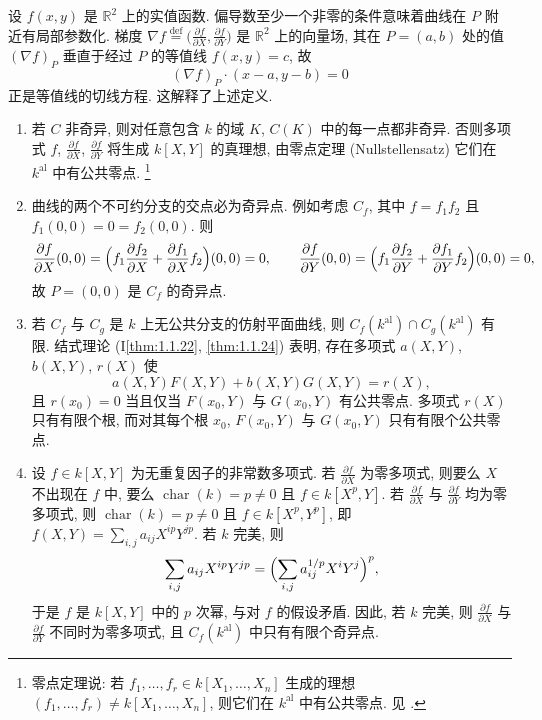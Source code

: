 \begin{aside} \label{thm:1.1.3} 
设 $f(x,y)$ 是 $\mathbb{R}^2$ 上的实值函数. 偏导数至少一个非零的条件意味着曲线在 $P$ 附近有局部参数化. 梯度 $\nabla f \overset{\text{def}}{=} \bigl(\frac{\partial f}{\partial X}, \frac{\partial f}{\partial Y}\bigr)$ 是 $\mathbb{R}^2$ 上的向量场, 其在 $P = (a,b)$ 处的值 $(\nabla f)_P$ 垂直于经过 $P$ 的等值线 $f(x,y) = c$, 故
\[
(\nabla f)_P \cdot (x-a, y-b) = 0
\]
正是等值线的切线方程. 这解释了上述定义.
\end{aside}

\begin{remark} \label{thm:1.1.4} 
\begin{enumerate}[label=\textup{(\alph*)}]
\item 若 $C$ 非奇异, 则对任意包含 $k$ 的域 $K$, $C(K)$ 中的每一点都非奇异. 否则多项式 $f$, $\frac{\partial f}{\partial X}$, $\frac{\partial f}{\partial Y}$ 将生成 $k[X,Y]$ 的真理想, 由零点定理 (Nullstellensatz) 它们在 $k^{\mathrm{al}}$ 中有公共零点.%
\footnote{零点定理说: 若 $f_1,\dots,f_r\in k[X_1,\dots,X_n]$ 生成的理想 $(f_1,\dots,f_r) \neq k[X_1,\dots,X_n]$, 则它们在 $k^{\mathrm{al}}$ 中有公共零点. 见 \cite[13.8]{milne-ca}.}
\item 曲线的两个不可约分支的交点必为奇异点. 例如考虑 $C_f$, 其中 $f = f_1f_2$ 且 $f_1(0,0) = 0 = f_2(0,0)$. 则
\[
\frac{\partial f}{\partial X}(0,0) = \Bigl(f_1\frac{\partial f_2}{\partial X} + \frac{\partial f_1}{\partial X}f_2\Bigr)(0,0) = 0,
\qquad
\frac{\partial f}{\partial Y}(0,0) = \Bigl(f_1\frac{\partial f_2}{\partial Y} + \frac{\partial f_1}{\partial Y}f_2\Bigr)(0,0) = 0,
\]
故 $P = (0,0)$ 是 $C_f$ 的奇异点.
\item 若 $C_f$ 与 $C_g$ 是 $k$ 上无公共分支的仿射平面曲线, 则 $C_f(k^{\mathrm{al}})\cap C_g(k^{\mathrm{al}})$ 有限. 结式理论 (I\ref{thm:1.1.22}, \ref{thm:1.1.24}) 表明, 存在多项式 $a(X,Y)$, $b(X,Y)$, $r(X)$ 使
\[
a(X,Y)F(X,Y) + b(X,Y)G(X,Y) = r(X),
\]
且 $r(x_0) = 0$ 当且仅当 $F(x_0,Y)$ 与 $G(x_0,Y)$ 有公共零点. 多项式 $r(X)$ 只有有限个根, 而对其每个根 $x_0$, $F(x_0,Y)$ 与 $G(x_0,Y)$ 只有有限个公共零点.
\item 设 $f\in k[X,Y]$ 为无重复因子的非常数多项式. 若 $\frac{\partial f}{\partial X}$ 为零多项式, 则要么 $X$ 不出现在 $f$ 中, 要么 $\operatorname{char}(k) = p\neq 0$ 且 $f\in k[X^p,Y]$. 若 $\frac{\partial f}{\partial X}$ 与 $\frac{\partial f}{\partial Y}$ 均为零多项式, 则 $\operatorname{char}(k) = p\neq 0$ 且 $f\in k[X^p,Y^p]$, 即 $f(X,Y) = \sum_{i,j} a_{ij}X^{ip}Y^{jp}$. 若 $k$ 完美, 则
\[
\sum_{i,j} a_{ij}X^{ip}Y^{jp} = \Bigl(\sum_{i,j} a_{ij}^{1/p}X^iY^j\Bigr)^p,
\]
于是 $f$ 是 $k[X,Y]$ 中的 $p$ 次幂, 与对 $f$ 的假设矛盾. 因此, 若 $k$ 完美, 则 $\frac{\partial f}{\partial X}$ 与 $\frac{\partial f}{\partial Y}$ 不同时为零多项式, 且 $C_f(k^{\mathrm{al}})$ 中只有有限个奇异点.
\end{enumerate}
\end{remark}

